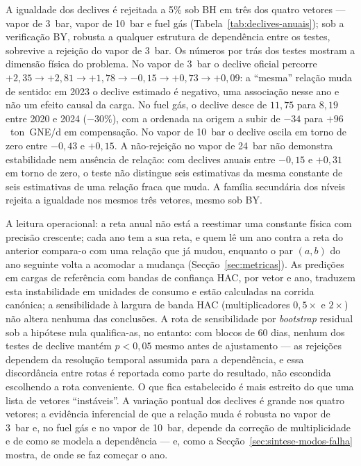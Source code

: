 A igualdade dos declives é rejeitada a 5\% sob BH em três dos quatro vetores
--- vapor de 3~bar, vapor de 10~bar e fuel gás
(Tabela~\ref{tab:declives-anuais}); sob a verificação BY, robusta a qualquer
estrutura de dependência entre os testes, sobrevive a rejeição do vapor de
3~bar. Os números por trás dos testes mostram a dimensão física do problema.
No vapor de 3~bar o declive oficial percorre $+2{,}35 \to +2{,}81 \to +1{,}78
\to -0{,}15 \to +0{,}73 \to +0{,}09$: a ``mesma'' relação muda de sentido: em
2023 o declive estimado é negativo, uma associação nesse ano e não um efeito
causal da carga. No fuel gás, o
declive desce de $11{,}75$ para $8{,}19$ entre 2020 e 2024 (${-}30\%$), com a
ordenada na origem a subir de $-34$ para $+96$~ton~GNE/d em compensação. No
vapor de 10~bar o declive oscila em torno de zero entre $-0{,}43$ e $+0{,}15$.
A não-rejeição no vapor de 24~bar não demonstra estabilidade nem ausência de
relação: com declives anuais entre $-0{,}15$ e $+0{,}31$ em torno de zero, o
teste não distingue seis estimativas da mesma constante de seis estimativas
de uma relação fraca que muda. A família secundária dos níveis
rejeita a igualdade nos mesmos três vetores, mesmo sob BY.

A leitura operacional: a reta anual não está a reestimar uma constante
física com precisão crescente; cada ano tem a sua reta, e quem lê um ano
contra a reta do anterior compara-o com uma relação que já mudou, enquanto
o par $(a, b)$ do ano seguinte volta a acomodar a mudança
(Secção~\ref{sec:metricas}). As predições em cargas de referência com bandas
de confiança HAC, por vetor e ano, traduzem esta instabilidade em unidades
de consumo e estão calculadas na corrida canónica; a sensibilidade à largura de banda HAC (multiplicadores $0{,}5\times$ e
$2\times$) não altera nenhuma das conclusões. A rota de sensibilidade por
\emph{bootstrap} residual sob a hipótese nula qualifica-as, no entanto: com
blocos de 60 dias, nenhum dos testes de declive mantém $p<0{,}05$ mesmo antes
de ajustamento --- as rejeições dependem da resolução temporal assumida para
a dependência, e essa discordância entre rotas é reportada como parte do
resultado, não escondida escolhendo a rota conveniente. O que fica
estabelecido é mais estreito do que uma lista de vetores ``instáveis''. A
variação pontual dos declives é grande nos quatro vetores; a evidência
inferencial de que a relação muda é robusta no vapor de 3~bar e, no fuel gás
e no vapor de 10~bar, depende da correção de multiplicidade e de como se
modela a dependência --- e, como a Secção~\ref{sec:sintese-modos-falha}
mostra, de onde se faz começar o ano.

